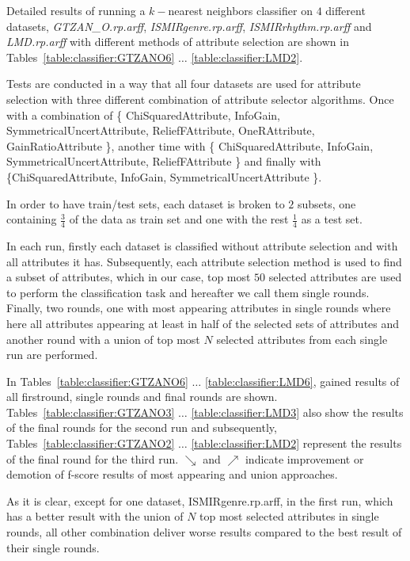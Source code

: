 Detailed results of running a $k-$nearest neighbors classifier on $4$ different
datasets, {\it GTZAN\_O.rp.arff}, {\it ISMIRgenre.rp.arff}, {\it
ISMIRrhythm.rp.arff} and {\it LMD.rp.arff} with different methods of attribute
selection are shown in Tables~\ref{table:classifier:GTZANO6} $\ldots$ \ref{table:classifier:LMD2}.

Tests are conducted in a way that all four datasets are used for attribute
selection with three different combination of attribute selector algorithms.
Once with a combination of \{ ChiSquaredAttribute, InfoGain,
SymmetricalUncertAttribute, ReliefFAttribute, OneRAttribute, GainRatioAttribute
\}, another time with \{ ChiSquaredAttribute, InfoGain,
SymmetricalUncertAttribute, ReliefFAttribute \} and finally with \{ChiSquaredAttribute, InfoGain,
SymmetricalUncertAttribute \}. 

In order to have train/test sets, each dataset is broken to $2$ subsets, one
containing $\frac{3}{4}$ of the data as train set and one with the rest
$\frac{1}{4}$ as a test set.

In each run, firstly each dataset is classified
without attribute selection and with all attributes it has. Subsequently, each
attribute selection method is used to find a subset of attributes, which in our
case, top most $50$ selected attributes are used to perform the
classification task and hereafter we call them single rounds. Finally, two
rounds, one with most appearing attributes in single rounds where here all
attributes appearing at least in half of the selected sets of attributes and another round with a union of top most $N$ selected attributes
from each single run are performed.

In Tables~\ref{table:classifier:GTZANO6} $\ldots$
\ref{table:classifier:LMD6}, gained results of all firstround, single rounds and
final rounds are shown. Tables~\ref{table:classifier:GTZANO3} $\ldots$
\ref{table:classifier:LMD3} also show the results of the final rounds for the
second run and subsequently, Tables~\ref{table:classifier:GTZANO2} $\ldots$
\ref{table:classifier:LMD2} represent the results of the final round for the
third run. $\searrow$ and $\nearrow$ indicate improvement or demotion of f-score
results of most appearing and union approaches.

As it is clear, except for one dataset, ISMIRgenre.rp.arff, in the first run,
which has a better result with the union of $N$ top most selected attributes in
single rounds, all other combination deliver worse results compared to the best
result of their single rounds.


